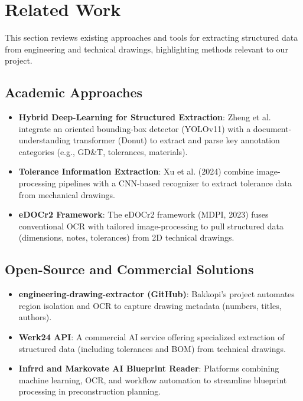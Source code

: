 \documentclass[11pt,a4paper]{article}
\begin{document}
\section*{Related Work}
This section reviews existing approaches and tools for extracting structured data from engineering and technical drawings, highlighting methods relevant to our project.

\subsection*{Academic Approaches}
\begin{itemize}
  \item \textbf{Hybrid Deep-Learning for Structured Extraction}: Zheng et al. integrate an oriented
    bounding-box detector (YOLOv11) with a document-understanding transformer (Donut) to
    extract and parse key annotation categories (e.g., GD\&T, tolerances, materials).
  \item \textbf{Tolerance Information Extraction}: Xu et al. (2024) combine image-processing pipelines
    with a CNN-based recognizer to extract tolerance data from mechanical drawings.
  \item \textbf{eDOCr2 Framework}: The eDOCr2 framework (MDPI, 2023) fuses conventional OCR with
    tailored image-processing to pull structured data (dimensions, notes, tolerances) from 2D
    technical drawings.
\end{itemize}

\subsection*{Open-Source and Commercial Solutions}
\begin{itemize}
  \item \textbf{engineering-drawing-extractor (GitHub)}: Bakkopi’s project automates region isolation
    and OCR to capture drawing metadata (numbers, titles, authors).
  \item \textbf{Werk24 API}: A commercial AI service offering specialized extraction of structured
    data (including tolerances and BOM) from technical drawings.
  \item \textbf{Infrrd and Markovate AI Blueprint Reader}: Platforms combining machine learning,
    OCR, and workflow automation to streamline blueprint processing in preconstruction planning.
\end{itemize}
\end{document}
